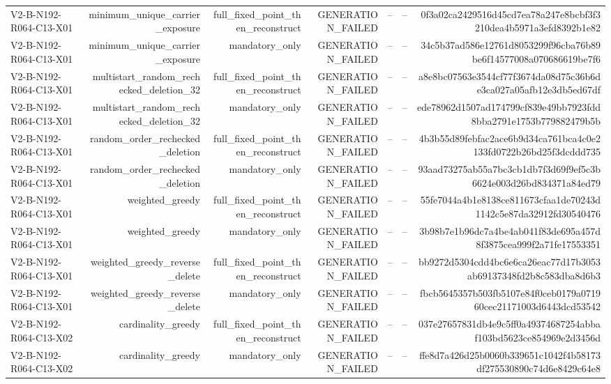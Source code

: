 {\begin{longtable}{lrrrrrr}
V2-B-N192-R064-C13-X01 & minimum\_unique\_carrier\_exposure & full\_fixed\_point\_then\_reconstruct & GENERATION\_FAILED & -- & -- & 0f3a02ca2429516d45cd7ea78a247e8bcbf3f3210dea4b5971a3efd8392b1e82 \\
V2-B-N192-R064-C13-X01 & minimum\_unique\_carrier\_exposure & mandatory\_only & GENERATION\_FAILED & -- & -- & 34c5b37ad586e12761d8053299f96cba76b89be6f14577008a070686619be7f6 \\
V2-B-N192-R064-C13-X01 & multistart\_random\_rechecked\_deletion\_32 & full\_fixed\_point\_then\_reconstruct & GENERATION\_FAILED & -- & -- & a8e8bc07563e3544cf77f3674da08d75c36b6de3ca027a05afb12e3db5ed67df \\
V2-B-N192-R064-C13-X01 & multistart\_random\_rechecked\_deletion\_32 & mandatory\_only & GENERATION\_FAILED & -- & -- & ede78962d1507ad174799cf839e49bb7923fdd8bba2791e1753b779882479b5b \\
V2-B-N192-R064-C13-X01 & random\_order\_rechecked\_deletion & full\_fixed\_point\_then\_reconstruct & GENERATION\_FAILED & -- & -- & 4b3b55d89febfac2ace6b9d34ca761bca4c0e2133fd0722b26bd25f3dcddd735 \\
V2-B-N192-R064-C13-X01 & random\_order\_rechecked\_deletion & mandatory\_only & GENERATION\_FAILED & -- & -- & 93aad73275ab55a7bc3cb1db7f3d69f9ef5c3b6624e003d26bd834371a84ed79 \\
V2-B-N192-R064-C13-X01 & weighted\_greedy & full\_fixed\_point\_then\_reconstruct & GENERATION\_FAILED & -- & -- & 55fe7044a4b1e8138ce811673cfaa1de70243d1142c5e87da32912fd30540476 \\
V2-B-N192-R064-C13-X01 & weighted\_greedy & mandatory\_only & GENERATION\_FAILED & -- & -- & 3b98b7e1b96dc7a4be4ab041f83de695a457d8f3875cea999f2a71fe17553351 \\
V2-B-N192-R064-C13-X01 & weighted\_greedy\_reverse\_delete & full\_fixed\_point\_then\_reconstruct & GENERATION\_FAILED & -- & -- & bb9272d5304cdd4bc6e6ca26eac77d17b3053ab69137348fd2b8c583dba8d6b3 \\
V2-B-N192-R064-C13-X01 & weighted\_greedy\_reverse\_delete & mandatory\_only & GENERATION\_FAILED & -- & -- & fbcb5645357b503fb5107e84f0ceb0179a071960cec21171003d6443dcd53542 \\
V2-B-N192-R064-C13-X02 & cardinality\_greedy & full\_fixed\_point\_then\_reconstruct & GENERATION\_FAILED & -- & -- & 037e27657831db4e9c5ff0a49374687254abbaf103bd5623ce854969e2d3456d \\
V2-B-N192-R064-C13-X02 & cardinality\_greedy & mandatory\_only & GENERATION\_FAILED & -- & -- & ffe8d7a426d25b0060b339651c1042f4b58173df275530890c74d6e8429c64e8 \\

\end{longtable}}

